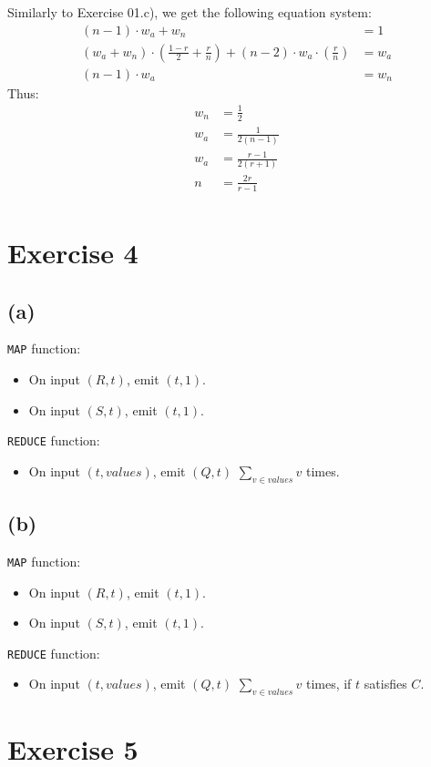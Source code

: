 \documentclass[12pt]{article}
\begin{document}
Similarly to Exercise 01.c), we get the following equation system:
\begin{align*}
	(n-1) \cdot w_a + w_n &= 1 \\
	(w_a + w_n) \cdot (\frac{1-r}{2} + \frac{r}{n}) + (n-2) \cdot w_a \cdot (\frac{r}{n}) &= w_a \\
	(n-1) \cdot w_a &= w_n
\end{align*}
Thus:
\begin{align*}
	w_n &= \frac{1}{2} \\
	w_a &= \frac{1}{2(n-1)} \\
	w_a &= \frac{r-1}{2(r+1)} \\
	n &= \frac{2r}{r-1} \\
\end{align*}

\section*{Exercise 4}
\subsection*{(a)}
\verb|MAP| function:
\begin{itemize}
	\item	On input $(R, t)$, emit $(t,1)$.
	\item	On input $(S, t)$, emit $(t,1)$.
\end{itemize}
\verb|REDUCE| function:
\begin{itemize}
	\item	On input $(t, values)$, emit $(Q,t)$ $\sum_{v \in values} v$ times.
\end{itemize}

\subsection*{(b)}
\verb|MAP| function:
\begin{itemize}
	\item	On input $(R, t)$, emit $(t,1)$.
	\item	On input $(S, t)$, emit $(t,1)$.
\end{itemize}
\verb|REDUCE| function:
\begin{itemize}
	\item	On input $(t, values)$, emit $(Q,t)$ $\sum_{v \in values} v$ times, if $t$ satisfies $C$.
\end{itemize}

\section*{Exercise 5}
\end{document}
